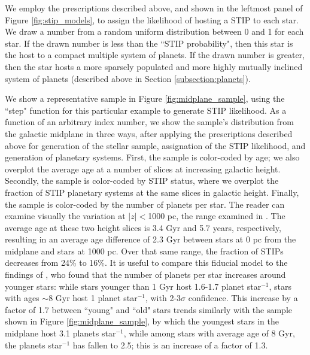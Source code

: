 \documentclass[twocolumn]{aastex631}
\begin{document}
We employ the prescriptions described above, and shown in the leftmost panel of Figure \ref{fig:stip_models}, to assign the likelihood of hosting a STIP to each star. We draw a number from a random uniform distribution between 0 and 1 for each star. If the drawn number is less than the ``STIP probability", then this star is the host to a compact multiple system of planets. If the drawn number is greater, then the star hosts a more sparsely populated and more highly mutually inclined system of planets (described above in Section \ref{subsection:planets}).

We show a representative sample in Figure \ref{fig:midplane_sample}, using the ``step" function for this particular example to generate STIP likelihood. As a function of an arbitrary index number, we show the sample's distribution from the galactic midplane in three ways, after applying the prescriptions described above for generation of the stellar sample, assignation of the STIP likelihood, and generation of planetary systems. First, the sample is color-coded by age; we also overplot the average age at a number of slices at increasing galactic height. Secondly, the sample is color-coded by STIP status, where we overplot the fraction of STIP planetary systems at the same slices in galactic height. Finally, the sample is color-coded by the number of planets per star. The reader can examine visually the variation at $|z|<$1000 pc, the range examined in \cite{zink_scaling_2023}. The average age at these two height slices is 3.4 Gyr and 5.7 years, respectively, resulting in an average age difference of 2.3 Gyr between stars at 0 pc from the midplane and stars at 1000 pc. Over that same range, the fraction of STIPs decreases from 24\% to 16\%. It is useful to compare this fiducial model to the findings of \cite{yang_planets_2023}, who found that the number of planets per star increases around younger stars: while stars younger than 1 Gyr host 1.6-1.7 planet star$^{-1}$, stars with ages $\sim$8 Gyr host 1 planet star$^{-1}$, with 2-3$\sigma$ confidence. This increase by a factor of 1.7 between ``young" and ``old" stars trends similarly with the sample shown in Figure \ref{fig:midplane_sample}, by which the youngest stars in the midplane host 3.1 planets star$^{-1}$, while among stars with average age of 8 Gyr, the planets star$^{-1}$ has fallen to 2.5; this is an increase of a factor of 1.3. 
\end{document}
